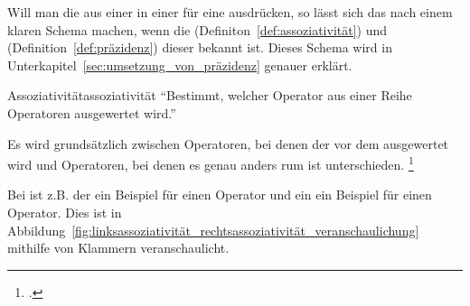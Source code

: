 Will man die  aus einer  in einer  für eine  ausdrücken, so lässt sich das nach einem klaren Schema machen, wenn die  (Definiton~\ref{def:assoziativität}) und  (Definition~\ref{def:präzidenz}) dieser  bekannt ist. Dieses Schema wird in Unterkapitel~\ref{sec:umsetzung_von_präzidenz} genauer erklärt.

\begin{Definition}{Assoziativität}{assoziativität}
  \enquote{Bestimmt, welcher Operator aus einer Reihe  Operatoren  ausgewertet wird.}

  Es wird grundsätzlich zwischen  Operatoren, bei denen der  vor dem  ausgewertet wird und  Operatoren, bei denen es genau anders rum ist unterschieden.
  \footcite{noauthor_parsing_nodate}
\end{Definition}

Bei  ist z.B. der  \smalltt{*} ein Beispiel für einen  Operator und ein  \smalltt{=} ein Beispiel für einen  Operator. Dies ist in Abbildung~\ref{fig:linksassoziativität_rechtsassoziativität_veranschaulichung} mithilfe von Klammern \smalltt{()} veranschaulicht.

